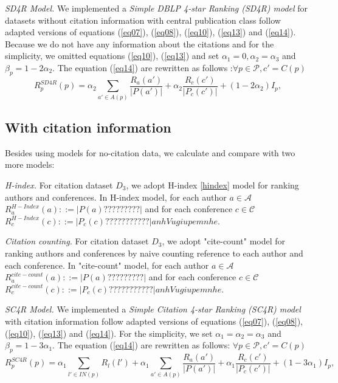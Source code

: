 \documentclass[10pt,leqno,twoside]{article}
\begin{document}
\textit{SD4R Model.} We implemented a \textit{Simple DBLP 4-star Ranking (SD4R) model} for datasets without citation information with central publication class follow adapted versions of equations (\ref{eq07}), (\ref{eq08}), (\ref{eq10}), (\ref{eq13}) and (\ref{eq14}).
Because we do not have any information about the citations and for the simplicity, we omitted equations (\ref{eq10}), (\ref{eq13}) and set $\alpha_1=0, \alpha_2=\alpha_3$ and $\beta_p = 1-2\alpha_2 $.  The equation (\ref{eq14}) are rewritten as follows :$\forall p\in\mathcal{P}, c' = C(p)$\
\begin{equation}\label{eq15}
R^{SD4R}_p(p) = \alpha_2\sum_{a'\in A(p)}\frac{R_a(a')}{|P(a')|} + \alpha_2\frac{R_c(c')}{|P_c(c')|} + (1-2\alpha_2)I_p,
\end{equation}
%

\subsection{With citation information}
Besides using models for no-citation data, we calculate and compare with two more models:

\textit{H-index.} For citation dataset $D_3$, we adopt H-index \ref{hindex} model for ranking authors and conferences. In H-index model, for each author $a \in \mathcal{A}$  $R^{H-Index}_a(a) ::= |P(a)?????????| $ and for each conference $c \in \mathcal{C}$  $R^{H-Index}_c(c) ::= |P_c(c)???????????| 
anh Vu giup em nhe$.


\textit{Citation counting.} For citation dataset $D_3$, we adopt "cite-count" model for ranking authors and conferences by naive counting reference to each author and each conference. In "cite-count" model, for each author $a \in \mathcal{A}$  $R^{cite-count}_a(a) ::= |P(a)?????????| $ and for each conference $c \in \mathcal{C}$  $R^{cite-count}_c(c) ::= |P_c(c)???????????| 
anh Vu giup em nhe$.

\textit{SC4R Model.} We implemented a \textit{Simple Citation 4-star Ranking (SC4R) model} with citation information follow adapted versions of equations (\ref{eq07}), (\ref{eq08}), (\ref{eq10}), (\ref{eq13}) and (\ref{eq14}).
For the simplicity, we set $\alpha_1=\alpha_2=\alpha_3$ and $\beta_p = 1-3\alpha_1 $.  The equation (\ref{eq14}) are rewritten as follows: $\forall p\in\mathcal{P}, c' = C(p)$\
\begin{equation}\label{eq15}
R^{SC4R}_p(p) = \alpha_1\sum_{l'\in IN(p)}R_l(l') + \alpha_1\sum_{a'\in A(p)}\frac{R_a(a')}{|P(a')|} + \alpha_1\frac{R_c(c')}{|P_c(c')|} + (1-3\alpha_1)I_p,
\end{equation}
\end{document}
